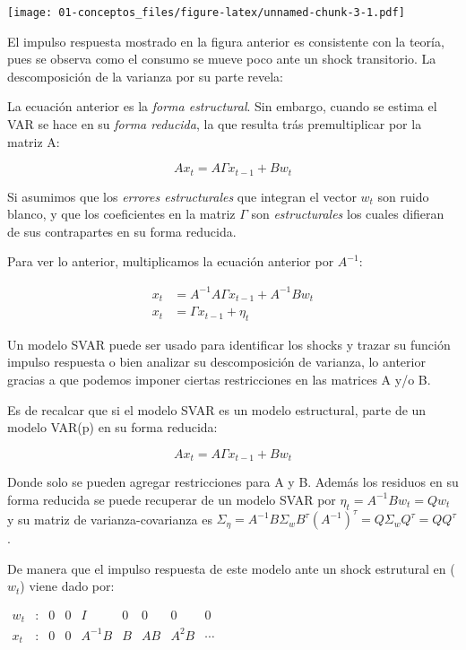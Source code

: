 \documentclass[
]{book}
\begin{document}
\texttt{[image: 01-conceptos\_files/figure-latex/unnamed-chunk-3-1.pdf]}

El impulso respuesta mostrado en la figura anterior es consistente con la teoría, pues se observa como el consumo se mueve poco ante un shock transitorio. La descomposición de la varianza por su parte revela:

La ecuación anterior es la \emph{forma estructural}. Sin embargo, cuando se estima el VAR se hace en su \emph{forma reducida}, la que resulta trás premultiplicar por la matriz A:

\begin{equation}
Ax_t = A\Gamma x_{t−1} + Bw_t
\end{equation}

Si asumimos que los \emph{errores estructurales} que integran el vector \(w_{t}\) son ruido blanco, y que los coeficientes en la matriz \(\Gamma\) son \emph{estructurales} los cuales difieran de sus contrapartes en su forma reducida.

Para ver lo anterior, multiplicamos la ecuación anterior por \(A^{-1}\):

\begin{align}
x_t &= A^{-1}A\Gamma x_{t−1} + A^{-1}Bw_t\\
x_t &= \Gamma x_{t−1} + \eta_t
\end{align}

Un modelo SVAR puede ser usado para identificar los shocks y trazar su función impulso respuesta o bien analizar su descomposición de varianza, lo anterior gracias a que podemos imponer ciertas restricciones en las matrices A y/o B.

Es de recalcar que si el modelo SVAR es un modelo estructural, parte de un modelo VAR(p) en su forma reducida:

\begin{equation}
Ax_t = A\Gamma x_{t−1} + Bw_t
\end{equation}

Donde solo se pueden agregar restricciones para A y B. Además los residuos en su forma reducida se puede recuperar de un modelo SVAR por \(\eta_t=A^{-1}Bw_t=Qw_t\) y su matriz de varianza-covarianza es \(\Sigma_\eta=A^{-1}B\Sigma_{w}B^{\tau}(A^{-1})^{\tau}=Q\Sigma_{w}Q^{\tau}=QQ^{\tau}\).

De manera que el impulso respuesta de este modelo ante un shock estrutural en (\(w_t\)) viene dado por:

\(\begin{array}{ccccccccc} w_{t} &\colon &0&0&I&0&0&0&0 \\ x_{t} &\colon &0&0&A^{-1}B&B&AB&A^{2}B&\cdots \end{array}\)
\end{document}
